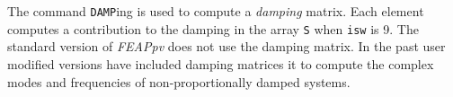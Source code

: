 \headb

The command {\tt DAMP}ing is used to compute a {\it damping}
matrix.  Each element computes a contribution to the damping
in the array {\tt S} when {\tt isw} is 9.
The standard version of {\sl FEAPpv} does not use the damping matrix.  In the
past user modified
versions have included damping matrices it to compute the complex modes
and frequencies of
non-proportionally damped systems.

\vfill\eject
